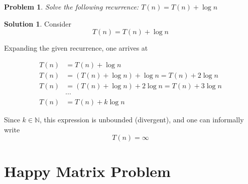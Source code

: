 \documentclass[11pt]{article}
\newtheorem*{problem}{Problem}
\theoremstyle{definition}
\newtheorem*{solution}{Solution}
\begin{document}
\begin{problem}
    Solve the following recurrence: $T(n)=T(n)+\log n$
\end{problem}
\begin{solution}
    Consider 
    $$
    T(n) = T(n) + \log n
    $$

    Expanding the given recurrence, one arrives at 

    \begin{align*}
        T(n) &= T(n) + \log n \\
        T(n) &= (T(n) + \log n) + \log n = T(n) + 2 \log n \\
        T(n) &= (T(n) + \log n) + 2 \log n = T(n) + 3 \log n \\
        &\cdots \\
        T(n) &= T(n) + k \log n \tag{$\forall k \in \mathbb N$}
    \end{align*}

    Since $k \in \mathbb N$, this expression is unbounded (divergent), and one can
    informally write
    $$
    T(n) = \infty
    $$
\end{solution}

\section{Happy Matrix Problem}
\end{document}
